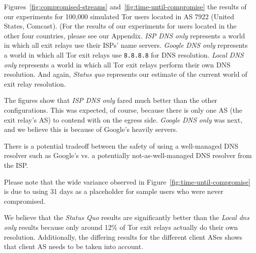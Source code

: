 Figures~\ref{fig:compromised-streams}
and~\ref{fig:time-until-compromise} the results of our experiments for 100,000 
simulated Tor users located in AS 7922 (United States, Comcast). (For the results 
of our experiments for users located in the other four countries, please see our Appendix. 
\emph{ISP DNS only} represents a world in which all exit relays use 
their ISPs' name servers. \emph{Google DNS only} represents a world in which all 
Tor exit relays use {\tt 8.8.8.8} for DNS resolution.  \emph{Local DNS only} represents 
a world in which all Tor exit relays perform their own DNS resolution.  And again, 
\emph{Status quo} represents our estimate of the current world of exit relay resolution.  

The figures show that \emph{ISP DNS only} fared much better than the other configurations. 
This was expected, of course, because there is only one AS (the exit relay's AS) to contend 
with on the egress side. \emph{Google DNS only} was next, and we believe this is because
 of Google's heavily  servers. 

There is a potential tradeoff between the safety of using a well-managed 
DNS resolver such as Google's vs. a potentially not-as-well-managed 
DNS resolver from the ISP.  

Please note that the wide variance observed in Figure~\ref{fig:time-until-compromise} is 
due to using 31 days as a placeholder for sample users who were never compromised.

We believe that the \emph{Status Quo} results are significantly better than the 
\emph{Local dns only} results because only around 12\% of Tor exit relays 
actually do their own resolution. Additionally, the differing results for the 
different client ASes shows that client AS needs to be taken into account. 
